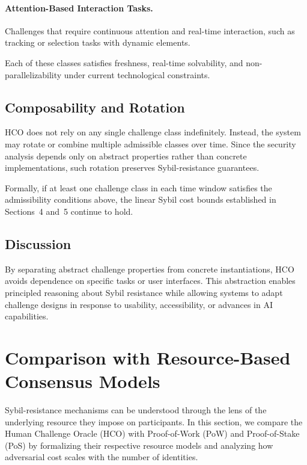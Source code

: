\documentclass[sigconf,nonacm]{acmart}
\begin{document}
\paragraph{Attention-Based Interaction Tasks.}
Challenges that require continuous attention and real-time interaction, such as tracking or selection tasks with dynamic elements.

Each of these classes satisfies freshness, real-time solvability, and non-parallelizability under current technological constraints.

\subsection{Composability and Rotation}

HCO does not rely on any single challenge class indefinitely. Instead, the system may rotate or combine multiple admissible classes over time. Since the security analysis depends only on abstract properties rather than concrete implementations, such rotation preserves Sybil-resistance guarantees.

Formally, if at least one challenge class in each time window satisfies the admissibility conditions above, the linear Sybil cost bounds established in Sections~4 and~5 continue to hold.

\subsection{Discussion}

By separating abstract challenge properties from concrete instantiations, HCO avoids dependence on specific tasks or user interfaces. This abstraction enables principled reasoning about Sybil resistance while allowing systems to adapt challenge designs in response to usability, accessibility, or advances in AI capabilities.

\section{Comparison with Resource-Based Consensus Models}
\label{sec:resource-comparison}

Sybil-resistance mechanisms can be understood through the lens of the underlying
resource they impose on participants. In this section, we compare the Human
Challenge Oracle (HCO) with Proof-of-Work (PoW) and Proof-of-Stake (PoS) by
formalizing their respective resource models and analyzing how adversarial cost
scales with the number of identities.
\end{document}
